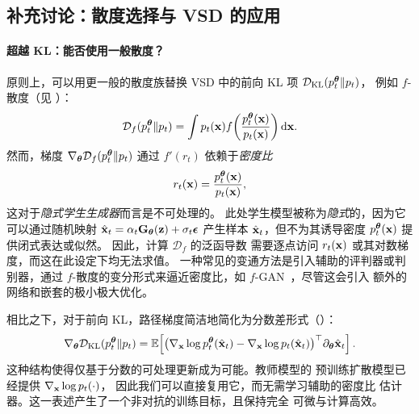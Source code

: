 \subsection{补充讨论：散度选择与 VSD 的应用}\label{subsec:vsd-discussion}


\paragraph{超越 KL：能否使用一般散度？}
原则上，可以用更一般的散度族替换 VSD 中的前向 KL 项
$\mathcal{D}_{\mathrm{KL}}(p_t^{{\bm{\theta}}}\|p_t)$，
例如 $f$-散度（见 ）：
\[
\mathcal{D}_f(p_t^{{\bm{\theta}}}\|p_t)
= \int p_t({\mathbf{x}})  f\!\left(\frac{p_t^{{\bm{\theta}}}({\mathbf{x}})}{p_t({\mathbf{x}})}\right)\mathop{}\!\mathrm{d} {\mathbf{x}}.
\]
然而，梯度
$\nabla_{{\bm{\theta}}}\mathcal{D}_f(p_t^{{\bm{\theta}}}\|p_t)$ 通过
$f'(r_t)$ 依赖于\emph{密度比}
\[
r_t({\mathbf{x}})=\frac{p_t^{{\bm{\theta}}}({\mathbf{x}})}{p_t({\mathbf{x}})},
\]
这对于\emph{隐式学生生成器}而言是不可处理的。
此处学生模型被称为\emph{隐式}的，因为它可以通过随机映射
$\hat{{\mathbf{x}}}_t=\alpha_t{\mathbf{G}}_{\bm{\theta}}({\mathbf{z}})+\sigma_t{\bm{\epsilon}}$ 产生样本
$\hat{{\mathbf{x}}}_t$，但不为其诱导密度
$p_t^{{\bm{\theta}}}({\mathbf{x}})$ 提供闭式表达或似然。
因此，计算 $\mathcal{D}_f$ 的泛函导数
需要逐点访问 $r_t({\mathbf{x}})$ 或其对数梯度，而这在此设定下均无法求值。
一种常见的变通方法是引入辅助的评判器或判别器，通过
$f$-散度的变分形式来逼近密度比，如 $f$-GAN~\citep{nowozin2016f}，尽管这会引入
额外的网络和嵌套的极小极大优化。

相比之下，对于前向 KL，路径梯度简洁地简化为分数差形式（）：
\[
\nabla_{{\bm{\theta}}}\mathcal{D}_{\mathrm{KL}}(p_t^{{\bm{\theta}}}\|p_t)
= \mathbb{E}\!\left[
  \big(\nabla_{{\mathbf{x}}}\log p_t^{{\bm{\theta}}}(\hat{{\mathbf{x}}}_t)
  - \nabla_{{\mathbf{x}}}\log p_t(\hat{{\mathbf{x}}}_t)\big)^\top
  \partial_{{\bm{\theta}}}\hat{{\mathbf{x}}}_t
\right].
\]
这种结构使得仅基于分数的可处理更新成为可能。教师模型的
预训练扩散模型已经提供 $\nabla_{{\mathbf{x}}}\log p_t(\cdot)$，
因此我们可以直接复用它，而无需学习辅助的密度比
估计器。这一表述产生了一个非对抗的训练目标，且保持完全
可微与计算高效。


